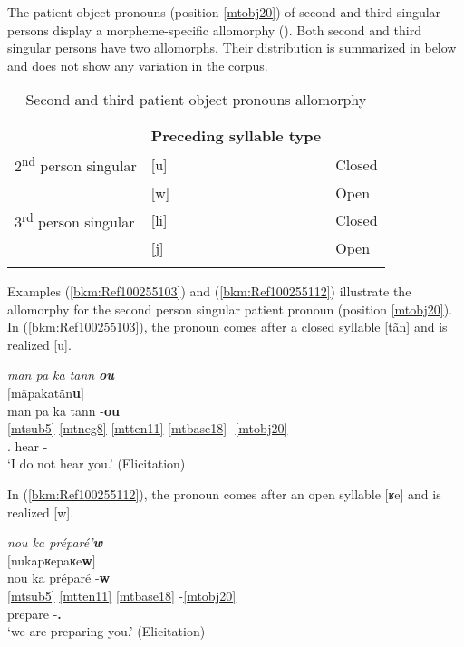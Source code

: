 \documentclass[output=paper]{langscibook}
\begin{document}
The patient object pronouns (position \ref{mtobj20}) of second and third singular persons display a morpheme-specific allomorphy (\citealt[23--24]{PinalieBernabe1999}). Both second and third singular persons have two allomorphs. Their distribution is summarized in  below and does not show any variation in the corpus.

\begin{table}
    \centering
     \caption{Second and third patient object pronouns allomorphy}
    \label{tab:mart:key:2}
    \begin{tabular}{lll}
    \lsptoprule
    \multicolumn{2}{c}{{\bfseries Patient object pronoun realizations}} & {\bfseries Preceding syllable type}\\ \midrule
    2\textsuperscript{nd} person singular & [u] & Closed\\
        & [w] & Open\\
    3\textsuperscript{rd} person singular & [li] & Closed\\
     & [j] & Open\\
    \lspbottomrule
\end{tabular}
\end{table}


Examples (\ref{bkm:Ref100255103}) and (\ref{bkm:Ref100255112}) illustrate the allomorphy for the second person singular patient pronoun (position \ref{mtobj20}). In (\ref{bkm:Ref100255103}), the pronoun comes after a closed syllable [tãn] and is realized [u].


\ea\label{bkm:Ref100255103}
\textit{man pa ka tann} \textbf{\textit{ou}}\\
 $[$mãpakatãn\textbf{u}$]$\\
\glll man pa ka tann -\textbf{ou}\\
\ref{mtsub5} \ref{mtneg8} \ref{mtten11} \ref{mtbase18} -\ref{mtobj20} \\ 
\First\Sg.\Sarg{} \Neg{} \Impf{} hear -\textbf{\Third\Sg{}}\\
\glt `I do not hear you.' (Elicitation)
\z

In (\ref{bkm:Ref100255112}), the pronoun comes after an open syllable [ʁe] and is realized [w].

\ea\label{bkm:Ref100255112}
\textit{nou ka préparé’}\textbf{\textit{w}}\\
$[$nukapʁepaʁe\textbf{\textup{w}}$]$\\
\glll  nou ka préparé -\textbf{w}\\
\ref{mtsub5} \ref{mtten11} \ref{mtbase18} -\ref{mtobj20} \\
\First\Pl{} \Impf{} prepare -\textbf{\Second\Sg.\Obj{}}\\
\glt `we are preparing you.' (Elicitation)
\z
\end{document}
